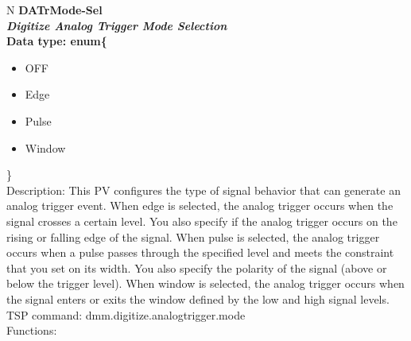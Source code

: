 \documentclass[openany]{article}
\begin{document}
		\begin{tabular}{N}
			\hline
			\bfseries DATrMode-Sel\label{pv:datrmode-sel} \\ \hline
			\emph{Digitize Analog Trigger Mode Selection} \\
			Data type: enum\{\begin{itemize}[noitemsep]
				\small
				\item[] OFF
				\item[] Edge
				\item[] Pulse
				\item[] Window
			\end{itemize}\} \\
			Description: This PV configures the type of signal behavior that can generate an analog trigger event. When edge is selected, the analog trigger occurs when the signal crosses a certain level. You also specify if the analog trigger occurs on the rising or falling edge of the signal. When pulse is selected, the analog trigger occurs when a pulse passes through the specified level and meets the constraint that you set on its width. You also specify the polarity of the signal (above or below the trigger level). When window is selected, the analog trigger occurs when the signal enters or exits the window defined by the low and high signal levels.\\
			TSP command: dmm.digitize.analogtrigger.mode \\
			Functions: \\
			\arrayrulecolor{\FuncTableBorderColor}

		\end{tabular}
\end{document}
